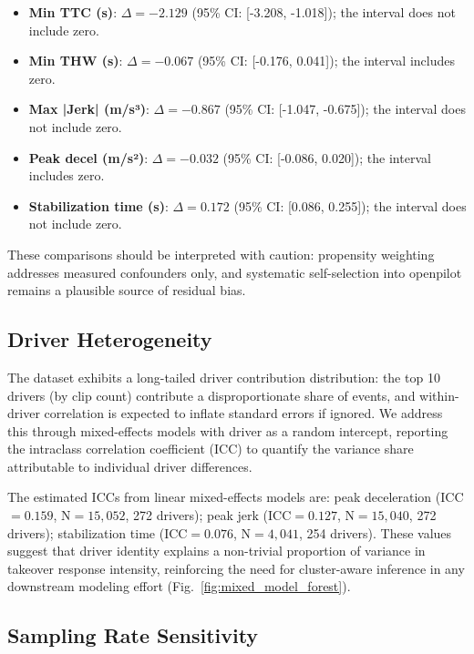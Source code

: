 \begin{itemize}[nosep]
  \item \textbf{Min TTC (s)}: $\Delta = -2.129$ (95\% CI: [-3.208, -1.018]); the interval does not include zero.
  \item \textbf{Min THW (s)}: $\Delta = -0.067$ (95\% CI: [-0.176, 0.041]); the interval includes zero.
  \item \textbf{Max |Jerk| (m/s³)}: $\Delta = -0.867$ (95\% CI: [-1.047, -0.675]); the interval does not include zero.
  \item \textbf{Peak decel (m/s²)}: $\Delta = -0.032$ (95\% CI: [-0.086, 0.020]); the interval includes zero.
  \item \textbf{Stabilization time (s)}: $\Delta = 0.172$ (95\% CI: [0.086, 0.255]); the interval does not include zero.
\end{itemize}

These comparisons should be interpreted with caution: propensity weighting addresses measured confounders only, and systematic self-selection into openpilot remains a plausible source of residual bias.

\subsection{Driver Heterogeneity}
\label{subsec:driver_heterogeneity}

The dataset exhibits a long-tailed driver contribution distribution: the top 10 drivers (by clip count) contribute a disproportionate share of events, and within-driver correlation is expected to inflate standard errors if ignored. We address this through mixed-effects models with driver as a random intercept, reporting the intraclass correlation coefficient (ICC) to quantify the variance share attributable to individual driver differences.

The estimated ICCs from linear mixed-effects models are: peak deceleration (ICC$=0.159$, N$=15,052$, 272 drivers); peak jerk (ICC$=0.127$, N$=15,040$, 272 drivers); stabilization time (ICC$=0.076$, N$=4,041$, 254 drivers). These values suggest that driver identity explains a non-trivial proportion of variance in takeover response intensity, reinforcing the need for cluster-aware inference in any downstream modeling effort (Fig.~\ref{fig:mixed_model_forest}).

\subsection{Sampling Rate Sensitivity}
\label{subsec:sampling_sensitivity}

